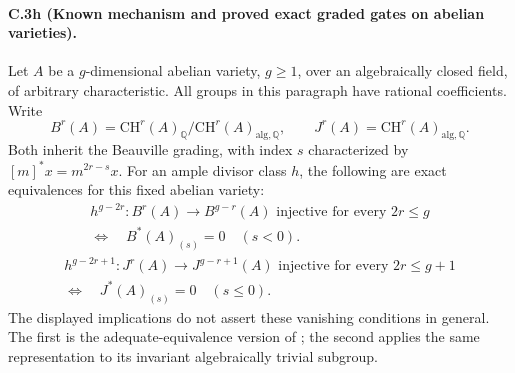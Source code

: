 \paragraph{C.3h (Known mechanism and proved exact graded gates on abelian varieties).}
Let $A$ be a $g$-dimensional abelian variety, $g\ge1$, over an algebraically
closed field, of arbitrary characteristic. All groups in this paragraph
have rational coefficients. Write
\[
 B^r(A)=\mathrm{CH}^r(A)_{\mathbb Q}/
                  \mathrm{CH}^r(A)_{\mathrm{alg},\mathbb Q},
 \qquad J^r(A)=\mathrm{CH}^r(A)_{\mathrm{alg},\mathbb Q}.
\]
Both inherit the Beauville grading, with index $s$ characterized by
$[m]^*x=m^{2r-s}x$. For an ample divisor class $h$, the following
are exact equivalences for this fixed abelian variety:
\begin{equation}\label{eq:C3-abelian-B}
 \begin{gathered}
 h^{g-2r}:B^r(A)\longrightarrow B^{g-r}(A)
 \text{ injective for every }2r\le g\\
 \Longleftrightarrow\quad B^*(A)_{(s)}=0\quad(s<0).
 \end{gathered}
\end{equation}
\begin{equation}\label{eq:C3-abelian-J}
 \begin{gathered}
 h^{g-2r+1}:J^r(A)\longrightarrow J^{g-r+1}(A)
 \text{ injective for every }2r\le g+1\\
 \Longleftrightarrow\quad J^*(A)_{(s)}=0\quad(s\le0).
 \end{gathered}
\end{equation}
The displayed implications do not assert these vanishing conditions
in general. The first is the adequate-equivalence version of
\citet[Proposition 5.11; footnote 1, p.~254]{rootBeauville2010};
the second applies the same representation to its invariant
algebraically trivial subgroup.

